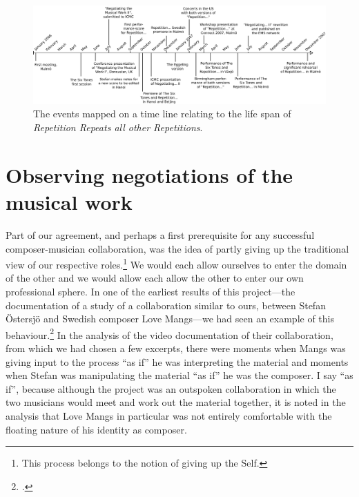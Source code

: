 \begin{figure}[htb]
  \centering
  \includegraphics[width=\textwidth]{img/Repetition-timeline}
  \caption[Time line of events relating to \emph{Repetition\ldots}]{The events mapped on a time line relating to the life span of \emph{Repetition Repeats all other Repetitions}.}
  \label{fig:repetition-timeline}
\end{figure}


\section{Observing negotiations of the musical work}
\label{sec:negotiating-1}


Part of our agreement, and perhaps a first prerequisite for any successful composer-musician collaboration, was the idea of partly giving up the traditional view of our respective roles.\footnote{This process belongs to the notion of giving up the Self.} We would each allow ourselves to enter the domain of the other and we would allow each allow the other to enter our own professional sphere. In one of the earliest results of this project---the documentation of a study of a collaboration similar to ours, between Stefan \"{O}stersj\"{o} and Swedish composer Love Mangs---we had seen an example of this behaviour.\footcite{frisk-ost06} In the analysis of the video documentation of their collaboration, from which we had chosen a few excerpts, there were moments when Mangs was giving input to the process ``as if'' he was interpreting the material and moments when Stefan was manipulating the material ``as if'' he was the composer. I say ``as if'', because although the project was an outspoken collaboration in which the two musicians would meet and work out the material together, it is noted in the analysis that  Love Mangs in particular was not entirely comfortable with the floating nature of his identity as composer.

